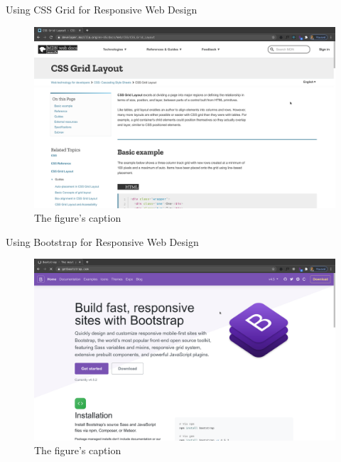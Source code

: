 \documentclass[14pt,aspectratio=169]{beamer}
\begin{document}
%
\begin{frame}{Using CSS Grid for Responsive Web Design}
  \begin{figure}
    \centering
    \includegraphics[scale=.085]{images/cssgrid-site.png}
    \caption{The figure's caption}
  \end{figure}
\end{frame}

%
\begin{frame}{Using Bootstrap for Responsive Web Design}
  \begin{figure}
    \centering
    \includegraphics[scale=.085]{images/bootstrap-site.png}
    \caption{The figure's caption}
  \end{figure}
\end{frame}
\end{document}
